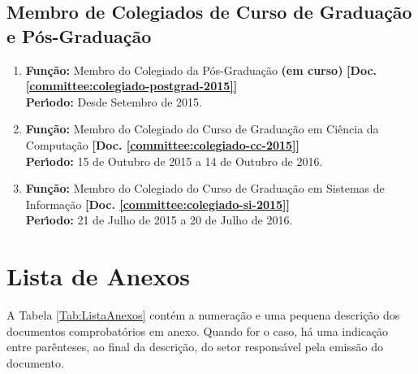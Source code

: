 \documentclass[a4paper,oneside,10pt]{article}
\newcounter{document}%
\begin{document}

\subsection{Membro de Colegiados de Curso de Gradua\c{c}\~{a}o e P\'{o}s-Gradua\c{c}\~{a}o}
\vspace{0.3cm}

\begin{enumerate}
\renewcommand{\labelenumi}{{\large\bfseries\arabic{enumi}.}}

\item   \textbf{Fun\c{c}\~{a}o:} Membro do Colegiado da P\'{o}s-Gradua\c{c}\~{a}o \textbf{(em curso)}  \textbf{[Doc. \ref{committee:colegiado-postgrad-2015}]} \\
        \textbf{Per\'{\i}odo:} Desde Setembro de 2015.

\item   \textbf{Fun\c{c}\~{a}o:} Membro do Colegiado do Curso de Graduação em Ciência da Computação \textbf{[Doc. \ref{committee:colegiado-cc-2015}]} \\
        \textbf{Per\'{\i}odo:} 15 de Outubro de 2015 a 14 de Outubro de 2016.

\item   \textbf{Fun\c{c}\~{a}o:} Membro do Colegiado do Curso de Graduação em Sistemas de Informação \textbf{[Doc. \ref{committee:colegiado-si-2015}]} \\
        \textbf{Per\'{\i}odo:} 21 de Julho de 2015 a 20 de Julho de 2016.

\end{enumerate}



\newpage
\section{Lista de Anexos}

A Tabela \ref{Tab:ListaAnexos} cont\'{e}m a numera\c{c}\~{a}o e uma pequena descri\c{c}\~{a}o dos documentos comprobat\'{o}rios em anexo. Quando for o caso, h\'{a} uma indica\c{c}\~{a}o entre par\^{e}nteses, ao final da descri\c{c}\~{a}o, do setor respons\'{a}vel pela emiss\~{a}o do documento.
\end{document}
